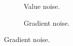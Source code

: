 \begin{figure}[h!]
  \centering
  \begin{subfigure}[b]{0.30\textwidth}
    \caption{Value noise. \cite{value_noise}}
  \end{subfigure}
  \quad
  \quad
  \quad
  \begin{subfigure}[b]{0.30\textwidth}
    \caption{Gradient noise.}
  \end{subfigure}


\end{figure}
